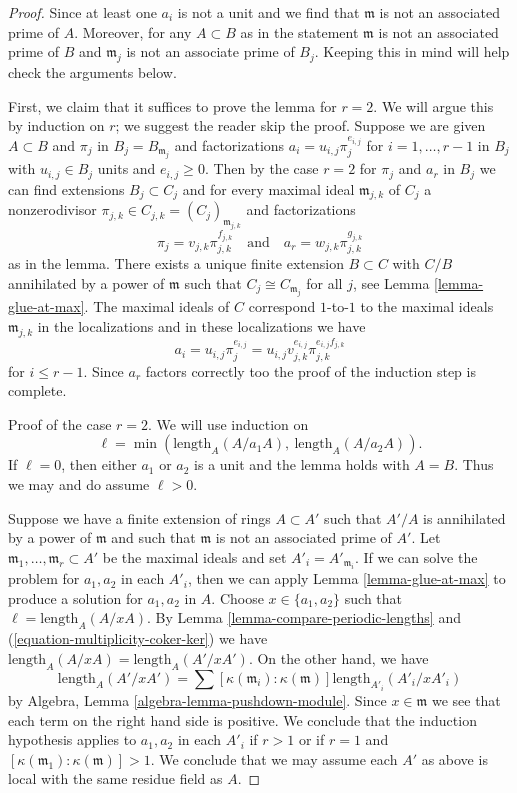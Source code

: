 \begin{proof}
Since at least one $a_i$ is not a unit and we find that $\mathfrak m$
is not an associated prime of $A$. Moreover, for any $A \subset B$
as in the statement $\mathfrak m$ is not an associated prime of $B$
and $\mathfrak m_j$ is not an associate prime of $B_j$.
Keeping this in mind will help check the arguments below.

\medskip\noindent
First, we claim that it suffices to prove the lemma for $r = 2$.
We will argue this by induction on $r$; we suggest the reader
skip the proof. Suppose we are given $A \subset B$ and $\pi_j$ in
$B_j = B_{\mathfrak m_j}$ and factorizations
$a_i = u_{i, j} \pi_j^{e_{i, j}}$ for $i = 1, \ldots, r - 1$ in $B_j$
with $u_{i, j} \in B_j$ units and $e_{i, j} \geq 0$.
Then by the case $r = 2$ for $\pi_j$ and $a_r$ in $B_j$
we can find extensions $B_j \subset C_j$ and for every maximal ideal
$\mathfrak m_{j, k}$ of $C_j$ a nonzerodivisor
$\pi_{j, k} \in C_{j, k} = (C_j)_{\mathfrak m_{j, k}}$
and factorizations
$$
\pi_j = v_{j, k} \pi_{j, k}^{f_{j, k}}
\quad\text{and}\quad
a_r = w_{j, k} \pi_{j, k}^{g_{j, k}}
$$
as in the lemma. There exists a unique finite extension $B \subset C$
with $C/B$ annihilated by a power of $\mathfrak m$ such
that $C_j \cong C_{\mathfrak m_j}$ for all $j$, see
Lemma \ref{lemma-glue-at-max}.
The maximal ideals of $C$ correspond $1$-to-$1$
to the maximal ideals $\mathfrak m_{j, k}$ in the localizations
and in these localizations we have
$$
a_i = u_{i, j} \pi_j^{e_{i, j}} =
u_{i, j} v_{j, k}^{e_{i, j}} \pi_{j, k}^{e_{i, j}f_{j, k}}
$$
for $i \leq r - 1$. Since $a_r$ factors correctly too the
proof of the induction step is complete.

\medskip\noindent
Proof of the case $r = 2$. We will use induction on
$$
\ell = \min(\text{length}_A(A/a_1A),\ \text{length}_A(A/a_2A)).
$$
If $\ell = 0$, then either $a_1$ or $a_2$ is a unit and
the lemma holds with $A = B$. Thus we may and do assume $\ell > 0$.

\medskip\noindent
Suppose we have a finite extension of rings $A \subset A'$ such that
$A'/A$ is annihilated by a power of $\mathfrak m$ and such that
$\mathfrak m$ is not an associated prime of $A'$.
Let $\mathfrak m_1, \ldots, \mathfrak m_r \subset A'$
be the maximal ideals and set $A'_i = A'_{\mathfrak m_i}$.
If we can solve the problem for $a_1, a_2$ in each $A'_i$,
then we can apply Lemma \ref{lemma-glue-at-max}
to produce a solution for $a_1, a_2$ in $A$.
Choose $x \in \{a_1, a_2\}$ such that $\ell = \text{length}_A(A/xA)$.
By Lemma \ref{lemma-compare-periodic-lengths} 
and (\ref{equation-multiplicity-coker-ker})
we have $\text{length}_A(A/xA) = \text{length}_A(A'/xA')$.
On the other hand, we have
$$
\text{length}_A(A'/xA') =
\sum [\kappa(\mathfrak m_i) : \kappa(\mathfrak m)]
\text{length}_{A'_i}(A'_i/xA'_i)
$$
by Algebra, Lemma \ref{algebra-lemma-pushdown-module}.
Since $x \in \mathfrak m$ we see that each term on the right hand side
is positive. We conclude that the induction hypothesis applies
to $a_1, a_2$ in each $A'_i$ if $r > 1$ or if $r = 1$ and
$[\kappa(\mathfrak m_1) : \kappa(\mathfrak m)] > 1$.
We conclude that we may assume each $A'$ as above is local with
the same residue field as $A$.


\end{proof}
